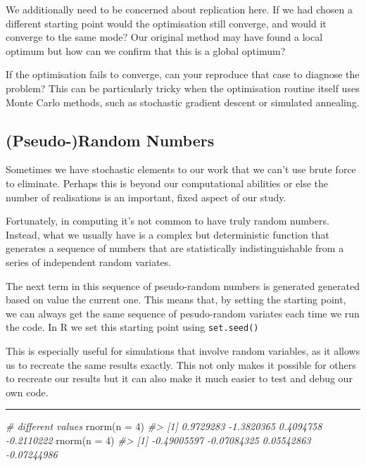 \documentclass[
  12pt,
]{book}
\newenvironment{Shaded}{\begin{snugshade}}{\end{snugshade}}
\newcommand{\AttributeTok}[1]{\textcolor[rgb]{0.77,0.63,0.00}{#1}}
\newcommand{\CommentTok}[1]{\textcolor[rgb]{0.56,0.35,0.01}{\textit{#1}}}
\newcommand{\DecValTok}[1]{\textcolor[rgb]{0.00,0.00,0.81}{#1}}
\newcommand{\FunctionTok}[1]{\textcolor[rgb]{0.00,0.00,0.00}{#1}}
\newcommand{\NormalTok}[1]{#1}
\begin{document}
We additionally need to be concerned about replication here. If we had chosen a different starting point would the optimisation still converge, and would it converge to the same mode? Our original method may have found a local optimum but how can we confirm that this is a global optimum?

If the optimisation fails to converge, can your reproduce that case to diagnose the problem? This can be particularly tricky when the optimisation routine itself uses Monte Carlo methods, such as stochastic gradient descent or simulated annealing.

\hypertarget{pseudo-random-numbers}{%
\subsection{(Pseudo-)Random Numbers}\label{pseudo-random-numbers}}

Sometimes we have stochastic elements to our work that we can't use brute force to eliminate. Perhaps this is beyond our computational abilities or else the number of realisations is an important, fixed aspect of our study.

Fortunately, in computing it's not common to have truly random numbers. Instead, what we usually have is a complex but deterministic function that generates a sequence of numbers that are statistically indistinguishable from a series of independent random variates.

The next term in this sequence of pseudo-random numbers is generated generated based on value the current one. This means that, by setting the starting point, we can always get the same sequence of pesudo-random variates each time we run the code. In R we set this starting point using \texttt{set.seed()}

This is especially useful for simulations that involve random variables, as it allows us to recreate the same results exactly. This not only makes it possible for others to recreate our results but it can also make it much easier to test and debug our own code.

\begin{center}\rule{0.5\linewidth}{0.5pt}\end{center}

\begin{Shaded}
\begin{Highlighting}[]
\CommentTok{\# different values}
\FunctionTok{rnorm}\NormalTok{(}\AttributeTok{n =} \DecValTok{4}\NormalTok{)}
\CommentTok{\#\textgreater{} [1]  0.9729283 {-}1.3820365  0.4094758 {-}0.2110222}
\FunctionTok{rnorm}\NormalTok{(}\AttributeTok{n =} \DecValTok{4}\NormalTok{)}
\CommentTok{\#\textgreater{} [1] {-}0.49005597 {-}0.07084325  0.05542863 {-}0.07244986}
\end{Highlighting}
\end{Shaded}
\end{document}
